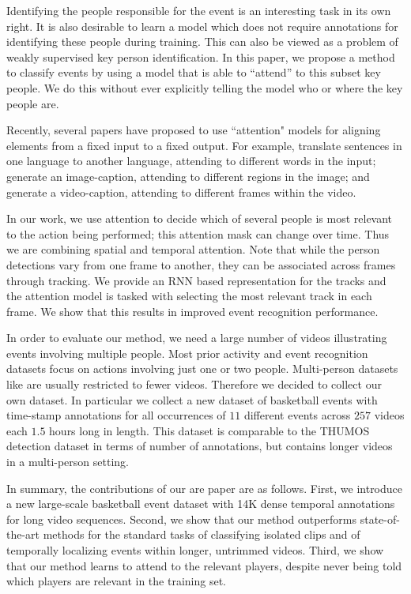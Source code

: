 Identifying the people responsible for the event is an interesting task in its
own right.  It is also desirable to learn a model which does not require
annotations for identifying these people during training. This can
also be viewed as a problem of weakly supervised key person identification. In
this paper, we propose a method  to classify events by using a model that is
able to ``attend'' to this subset key people.  We  do this without ever
explicitly telling the model who or where the key people are.

Recently, several papers have proposed to use ``attention" models for aligning
elements from a fixed input to a fixed output.  For example,
\cite{Bahdnau_arxiv14} translate sentences in one language to another language,
attending to different words in the input; \cite{Xu_arxiv15} generate an image-caption,
attending to different regions in the image; and
\cite{Yao_arxiv15} generate a video-caption, attending to different
frames within the video.


In our work, we use attention to decide which of several people is most
relevant to the action being performed; this attention mask can change over
time. Thus we are combining spatial and temporal attention.  Note that while
the person detections vary from one frame to another, they can be associated
across frames through tracking. We provide an RNN based representation for the
tracks and the attention model is tasked with selecting the most relevant
track in each frame. We show that this results in improved event recognition
performance.

In order to evaluate our method, we need a large number of videos illustrating
events involving multiple people. Most prior activity and event
recognition datasets focus on actions involving just one or two people.
Multi-person datasets like \cite{Ryoo_ICCV09,VIRAT,Choi_ICCV09} are usually restricted to fewer videos.
Therefore we decided to collect our own dataset.
In particular we collect a new dataset of basketball events with time-stamp annotations for
all occurrences of $11$ different events across $257$ videos each $1.5$ hours
long in length.  This dataset is comparable to the THUMOS \cite{THUMOS}
detection dataset in terms of number of annotations, but contains longer videos
in a multi-person setting.

In summary, the contributions of our are paper are as follows.  First, we
introduce a new  large-scale basketball event dataset with 14K dense temporal
annotations for long video sequences.  Second, we show that our method
outperforms state-of-the-art methods for the standard tasks of classifying
isolated clips and of temporally localizing events within longer, untrimmed
videos.  Third, we show that our method learns to attend to the relevant
players, despite never being told which players are relevant in the training
set.
